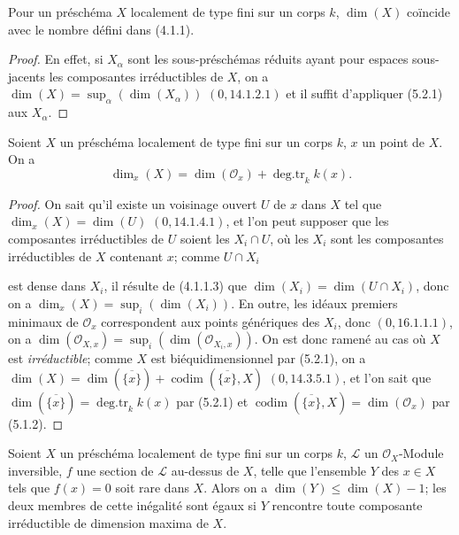 \begin{corollary}[5.2.2]
\label{IV.2.5.2.2-fr}
Pour un préschéma $X$ localement de type fini sur un corps $k$, $\dim(X)$
coïncide avec le nombre défini dans (4.1.1).
\end{corollary}

\begin{proof}
En effet, si $X_\alpha$ sont les sous-préschémas réduits ayant pour espaces
sous-jacents les composantes irréductibles de $X$, on a
$\dim(X)=\sup_\alpha(\dim(X_\alpha))$ $(0,14.1.2.1)$ et il suffit d'appliquer
(5.2.1) aux $X_\alpha$.
\end{proof}

\begin{corollary}[5.2.3]
\label{IV.2.5.2.3-fr}
Soient $X$ un préschéma localement de type fini sur un corps $k$, $x$ un
point de $X$. On a
\begin{equation}
\dim_x(X)=\dim(\mathcal O_x)+\operatorname{deg.tr}_k k(x).
\tag{5.2.3.1}\label{IV.2.5.2.3.1-fr}
\end{equation}
\end{corollary}

\begin{proof}
On sait qu'il existe un voisinage ouvert $U$ de $x$ dans $X$ tel que
$\dim_x(X)=\dim(U)$ $(0,14.1.4.1)$, et l'on peut supposer que les composantes
irréductibles de $U$ soient les $X_i\cap U$, où les $X_i$ sont les
composantes irréductibles de $X$ contenant $x$; comme $U\cap X_i$


est dense dans $X_i$, il résulte de (4.1.1.3) que
$\dim(X_i)=\dim(U\cap X_i)$, donc on a
$\dim_x(X)=\sup_i(\dim(X_i))$. En outre, les idéaux premiers minimaux de
$\mathcal O_x$ correspondent aux points génériques des $X_i$, donc
$(0,16.1.1.1)$, on a
$\dim(\mathcal O_{X,x})=\sup_i(\dim(\mathcal O_{X_i,x}))$. On est donc ramené
au cas où $X$ est \emph{irréductible}; comme $X$ est biéquidimensionnel par
(5.2.1), on a
$\dim(X)=\dim(\overline{\{x\}})+\operatorname{codim}(\overline{\{x\}},X)$
$(0,14.3.5.1)$, et l'on sait que
$\dim(\overline{\{x\}})=\operatorname{deg.tr}_k k(x)$ par (5.2.1) et
$\operatorname{codim}(\overline{\{x\}},X)=\dim(\mathcal O_x)$ par (5.1.2).
\end{proof}

\begin{corollary}[5.2.4]
\label{IV.2.5.2.4-fr}
Soient $X$ un préschéma localement de type fini sur un corps $k$, $\mathcal L$
un $\mathcal O_X$-Module inversible, $f$ une section de $\mathcal L$ au-dessus
de $X$, telle que l'ensemble $Y$ des $x\in X$ tels que $f(x)=0$ soit rare
dans $X$. Alors on a $\dim(Y)\leq\dim(X)-1$; les deux membres de cette
inégalité sont égaux si $Y$ rencontre toute composante irréductible de
dimension maxima de $X$.
\end{corollary}

